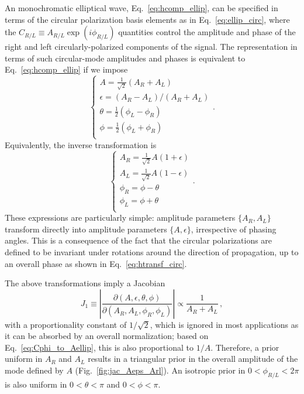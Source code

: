 \documentclass[aps,prd,twocolumn,superscriptaddress,preprintnumbers,floatfix,nofootinbib]{revtex4-2}
\newcommand*{\eq}[1]{Eq.~\eqref{eq:#1}}
\begin{document}
An monochromatic elliptical wave, Eq.~\eqref{eq:hcomp_ellip}, can be specified in terms of the circular polarization basis elements as in \eq{ellip_circ},
where the $C_{R/L} \equiv A_{R/L} \exp(i\phi_{R/L})$ quantities control the amplitude and phase of the right and left circularly-polarized components of the signal.
%
The representation in terms of such circular-mode amplitudes and phases is equivalent to Eq.~\eqref{eq:hcomp_ellip} if we impose
\begin{equation} \label{eq:Cphi_to_Aellip}
\begin{cases}
A = \frac{1}{\sqrt{2}}\left(A_R + A_L\right) \\
\epsilon = (A_R - A_L)/(A_R + A_L) \\ 
\theta = \frac{1}{2}(\phi_L - \phi_R)\\
\phi = \frac{1}{2}(\phi_L + \phi_R)\\
\end{cases} .
\end{equation}
Equivalently, the inverse transformation is 
\begin{equation} \label{eq:Aellip_to_Cphi}
\begin{cases}
A_R = \frac{1}{\sqrt{2}} A \left(1 + \epsilon\right) \\
A_L = \frac{1}{\sqrt{2}} A \left(1 - \epsilon\right) \\
\phi_R = \phi - \theta \\ 
\phi_L = \phi + \theta \\ 
\end{cases} .
\end{equation}
These expressions are particularly simple: amplitude parameters $\{ A_R, A_L\}$ transform directly into amplitude parameters $\{A, \epsilon\}$, irrespective of phasing angles.
This is a consequence of the fact that the circular polarizations are defined to be invariant under rotations around the direction of propagation, up to an overall phase as shown in \eq{htransf_circ}.

The above transformations imply a Jacobian
\begin{equation} \label{eq:jac_Aeps_Arl}
J_1 \equiv \left| \frac{\partial(A,\epsilon,\theta,\phi)}{\partial(A_R, A_L, \phi_R, \phi_L)}\right| \propto \frac{1}{A_R + A_L}\, ,
\end{equation}
with a proportionality constant of $1/\sqrt{2}$, which is ignored in most applications as it can be absorbed by an overall normalization; based on \eq{Cphi_to_Aellip}, this is also proportional to $1/A$.
Therefore, a prior uniform in $A_R$ and $A_L$ results in a triangular prior in the overall amplitude of the mode defined by $A$ (Fig.~\ref{fig:jac_Aeps_Arl}).
An isotropic prior in $0 < \phi_{R/L} < 2\pi$ is also uniform in $0 < \theta <\pi$ and $0 < \phi <\pi$.
\end{document}
